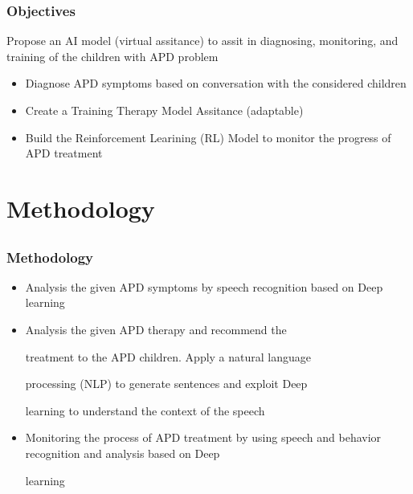 \documentclass{beamer}
\begin{document}
\begin{frame}
\frametitle{Objectives}
Propose an AI model (virtual assitance) to assit in diagnosing, monitoring, and training of the children with APD problem
\begin{itemize}
	\item Diagnose APD symptoms based on conversation with the considered children
	\item Create a Training Therapy Model Assitance (adaptable)
	\item Build the Reinforcement Learining (RL) Model to monitor the progress of APD treatment
\end{itemize}

\end{frame}
\section{Methodology } %
\subsection{} %

\begin{frame}
	\frametitle{Methodology}
	\begin{itemize}
		\item Analysis  the  given  APD  symptoms  by  speech  	
		recognition  based  on  Deep  learning
		
		\item \color{gray} Analysis  the  given  APD  therapy  and  recommend  the
		
		treatment  to  the  APD  children.  Apply  a  natural  language
		
		processing  (NLP)  to  generate  sentences  and  exploit  Deep
		
		learning  to  understand  the  context  of  the  speech
		
		\item Monitoring  the  process  of  APD  treatment  by  using  speech 	and  behavior  recognition  and  analysis  based  on  Deep
		
		learning
	\end{itemize}

\end{frame}
\end{document}
